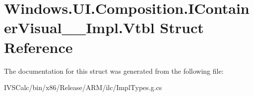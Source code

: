 \hypertarget{struct_windows_1_1_u_i_1_1_composition_1_1_i_container_visual_____impl_1_1_vtbl}{}\section{Windows.\+U\+I.\+Composition.\+I\+Container\+Visual\+\_\+\+\_\+\+Impl.\+Vtbl Struct Reference}
\label{struct_windows_1_1_u_i_1_1_composition_1_1_i_container_visual_____impl_1_1_vtbl}


The documentation for this struct was generated from the following file\+:\begin{DoxyCompactItemize}
\item 
I\+V\+S\+Calc/bin/x86/\+Release/\+A\+R\+M/ilc/Impl\+Types.\+g.\+cs\end{DoxyCompactItemize}
